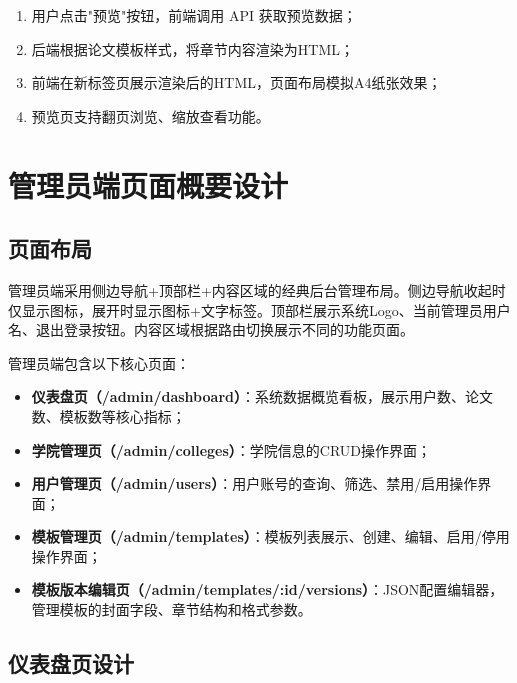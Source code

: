 \documentclass{../../softeng}
\begin{document}
\begin{enumerate}
    \item 用户点击"预览"按钮，前端调用 API 获取预览数据；
    \item 后端根据论文模板样式，将章节内容渲染为HTML；
    \item 前端在新标签页展示渲染后的HTML，页面布局模拟A4纸张效果；
    \item 预览页支持翻页浏览、缩放查看功能。
\end{enumerate}

\section{管理员端页面概要设计}

\subsection{页面布局}

管理员端采用侧边导航+顶部栏+内容区域的经典后台管理布局。侧边导航收起时仅显示图标，展开时显示图标+文字标签。顶部栏展示系统Logo、当前管理员用户名、退出登录按钮。内容区域根据路由切换展示不同的功能页面。

管理员端包含以下核心页面：
\begin{itemize}
    \item \textbf{仪表盘页（/admin/dashboard）}：系统数据概览看板，展示用户数、论文数、模板数等核心指标；
    \item \textbf{学院管理页（/admin/colleges）}：学院信息的CRUD操作界面；
    \item \textbf{用户管理页（/admin/users）}：用户账号的查询、筛选、禁用/启用操作界面；
    \item \textbf{模板管理页（/admin/templates）}：模板列表展示、创建、编辑、启用/停用操作界面；
    \item \textbf{模板版本编辑页（/admin/templates/:id/versions）}：JSON配置编辑器，管理模板的封面字段、章节结构和格式参数。
\end{itemize}

\subsection{仪表盘页设计}
\end{document}
